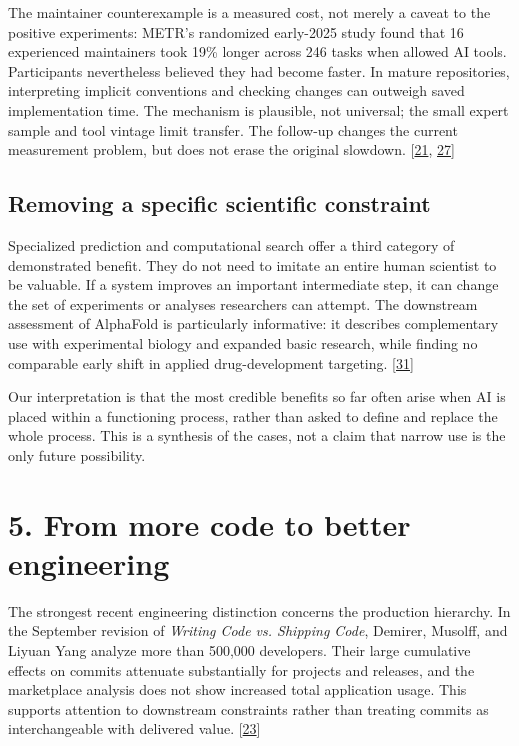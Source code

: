 The maintainer counterexample is a measured cost, not merely a caveat to the positive experiments: METR's randomized early-2025 study found that 16 experienced maintainers took 19\% longer across 246 tasks when allowed AI tools. Participants nevertheless believed they had become faster. In mature repositories, interpreting implicit conventions and checking changes can outweigh saved implementation time. The mechanism is plausible, not universal; the small expert sample and tool vintage limit transfer. The follow-up changes the current measurement problem, but does not erase the original slowdown. [\hyperlink{ref-metr2025}{21}, \hyperlink{ref-metr2026update}{27}]



\subsection*{Removing a specific scientific constraint}
Specialized prediction and computational search offer a third category of demonstrated benefit. They do not need to imitate an entire human scientist to be valuable. If a system improves an important intermediate step, it can change the set of experiments or analyses researchers can attempt. The downstream assessment of AlphaFold is particularly informative: it describes complementary use with experimental biology and expanded basic research, while finding no comparable early shift in applied drug-development targeting. [\hyperlink{ref-alphafoldimpact2026}{31}]


Our interpretation is that the most credible benefits so far often arise when AI is placed within a functioning process, rather than asked to define and replace the whole process. This is a synthesis of the cases, not a claim that narrow use is the only future possibility.



\section*{5. From more code to better engineering}
The strongest recent engineering distinction concerns the production hierarchy. In the September revision of \emph{Writing Code vs. Shipping Code}, Demirer, Musolff, and Liyuan Yang analyze more than 500,000 developers. Their large cumulative effects on commits attenuate substantially for projects and releases, and the marketplace analysis does not show increased total application usage. This supports attention to downstream constraints rather than treating commits as interchangeable with delivered value. [\hyperlink{ref-demirer2026}{23}]


